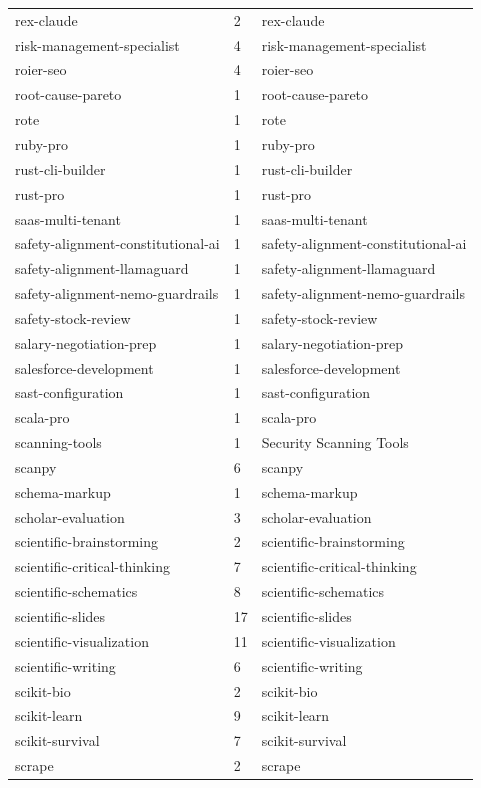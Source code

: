 \begin{longtable}{@{}lll@{}}
rex-claude & 2 & rex-claude\\
risk-management-specialist & 4 & risk-management-specialist\\
roier-seo & 4 & roier-seo\\
root-cause-pareto & 1 & root-cause-pareto\\
rote & 1 & rote\\
ruby-pro & 1 & ruby-pro\\
rust-cli-builder & 1 & rust-cli-builder\\
rust-pro & 1 & rust-pro\\
saas-multi-tenant & 1 & saas-multi-tenant\\
safety-alignment-constitutional-ai & 1 & safety-alignment-constitutional-ai\\
safety-alignment-llamaguard & 1 & safety-alignment-llamaguard\\
safety-alignment-nemo-guardrails & 1 & safety-alignment-nemo-guardrails\\
safety-stock-review & 1 & safety-stock-review\\
salary-negotiation-prep & 1 & salary-negotiation-prep\\
salesforce-development & 1 & salesforce-development\\
sast-configuration & 1 & sast-configuration\\
scala-pro & 1 & scala-pro\\
scanning-tools & 1 & Security Scanning Tools\\
scanpy & 6 & scanpy\\
schema-markup & 1 & schema-markup\\
scholar-evaluation & 3 & scholar-evaluation\\
scientific-brainstorming & 2 & scientific-brainstorming\\
scientific-critical-thinking & 7 & scientific-critical-thinking\\
scientific-schematics & 8 & scientific-schematics\\
scientific-slides & 17 & scientific-slides\\
scientific-visualization & 11 & scientific-visualization\\
scientific-writing & 6 & scientific-writing\\
scikit-bio & 2 & scikit-bio\\
scikit-learn & 9 & scikit-learn\\
scikit-survival & 7 & scikit-survival\\
scrape & 2 & scrape\\

\end{longtable}
